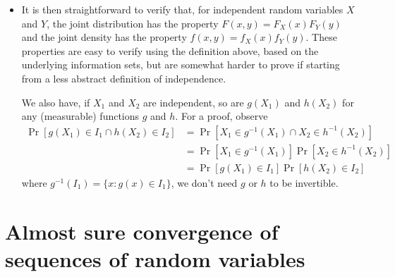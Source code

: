 \begin{itemize}
\item It is then straightforward to verify that, for independent
  random variables $X$ and $Y$, the joint distribution has the
  property $F(x, y) = F_X(x) F_Y(y)$ and the joint density has the
  property $f(x,y) = f_X(x) f_Y(y)$.  These properties are easy to
  verify using the definition above, based on the underlying
  information sets, but are somewhat harder to prove if starting from
  a less abstract definition of independence.

  We also have, if $X_1$ and $X_2$ are independent, so are $g(X_1)$ and
  $h(X_2)$ for any (measurable) functions $g$ and $h$.  For a proof,
  observe
  \begin{align*}
    \Pr[g(X_1) \in I_1 \cap h(X_2) \in I_2]
    &= \Pr[X_1 \in g^{-1}(X_1) \cap X_2 \in h^{-1}(X_2)] \\
    &= \Pr[X_1 \in g^{-1}(X_1)] \Pr[X_2 \in h^{-1}(X_2)] \\
    &= \Pr[g(X_1) \in I_1] \Pr[h(X_2) \in I_2]
  \end{align*}
  where $g^{-1}(I_1) = \{x : g(x) \in I_1\}$, we don't need $g$ or $h$ to
  be invertible.

\end{itemize}

\section{Almost sure convergence of sequences of random variables}

